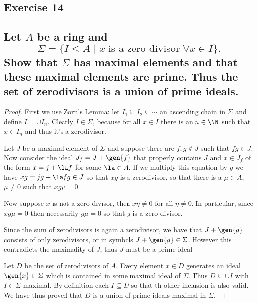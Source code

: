 \subsection*{Exercise 14}
\subsection*{%
Let $A$ be a ring and
\[
	\Sigma=\{I\leq A \mid x\;\text{is a zero divisor}\;\forall x\in I\}.
\]
Show that $\Sigma$ has maximal elements and that these maximal elements are prime.
Thus the set of zerodivisors is a union of prime ideals.
} 

\begin{proof}%
First we use Zorn's Lemma: let $I_1\subseteq I_2\subseteq \cdots$ an ascending
chain in $\Sigma$ and define $I=\cup I_n$. Clearly $I\in\Sigma$, because for all
$x\in I$ there is an $n\in\NN$ such that $x\in I_n$ and thus it's a zerodivisor.

Let $J$ be a maximal element of $\Sigma$ and suppose there are $f,g\not\in J$
such that $fg\in J$. Now consider the ideal $J_f=J+\gen{f}$ that properly contains
$J$ and $x\in J_f$ of the form $x=j+\la f$ for some $\la\in A$. If we multiply
this equation by $g$ we have $xg=jg+\la fg\in J$ so that $xg$ is a zerodivisor,
so that there is a $\mu\in A$, $\mu\neq 0$ such that $xg\mu=0$

Now suppose $x$ is not a zero divisor, then $x\eta\neq 0$ for all $\eta\neq 0$.
In particular, since $xg\mu=0$ then necessarily $g\mu=0$ so that $g$ is a zero
divisor.

Since the sum of zerodivisors is again a zerodivisor, we have that $J+\gen{g}$
consists of only zerodivisors, or in symbols $J+\gen{g}\in\Sigma$. However this
contradicts the maximality of $J$, thus $J$ must be a prime ideal.

Let $D$ be the set of zerodivisors of $A$. Every element $x\in D$ generates an
ideal $\gen{x}\in\Sigma$ which is contained in some maximal ideal of $\Sigma$.
Thus $D\subseteq \cup I$ with $I\in\Sigma$ maximal. By definition each $I\subseteq D$
so that th other inclusion is also valid. We have thus proved that $D$ is a union
of prime ideals maximal in $\Sigma$.

%
\end{proof}%

